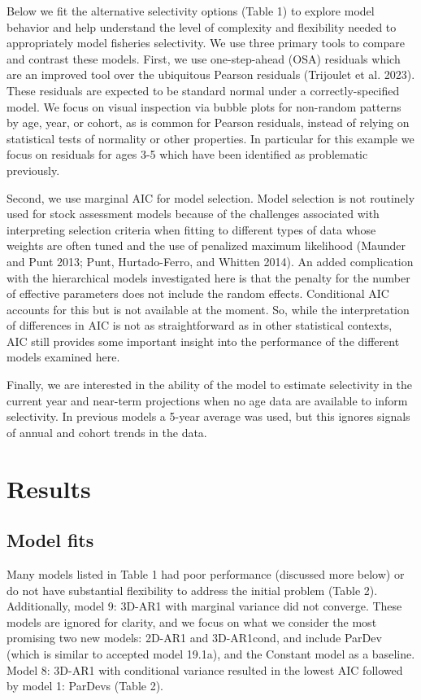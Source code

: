 \documentclass[
]{article}
\begin{document}
Below we fit the alternative selectivity options (Table 1) to explore
model behavior and help understand the level of complexity and
flexibility needed to appropriately model fisheries selectivity. We use
three primary tools to compare and contrast these models. First, we use
one-step-ahead (OSA) residuals which are an improved tool over the
ubiquitous Pearson residuals (Trijoulet et al. 2023). These residuals
are expected to be standard normal under a correctly-specified model. We
focus on visual inspection via bubble plots for non-random patterns by
age, year, or cohort, as is common for Pearson residuals, instead of
relying on statistical tests of normality or other properties. In
particular for this example we focus on residuals for ages 3-5 which
have been identified as problematic previously.

Second, we use marginal AIC for model selection. Model selection is not
routinely used for stock assessment models because of the challenges
associated with interpreting selection criteria when fitting to
different types of data whose weights are often tuned and the use of
penalized maximum likelihood (Maunder and Punt 2013; Punt,
Hurtado-Ferro, and Whitten 2014). An added complication with the
hierarchical models investigated here is that the penalty for the number
of effective parameters does not include the random effects. Conditional
AIC accounts for this but is not available at the moment. So, while the
interpretation of differences in AIC is not as straightforward as in
other statistical contexts, AIC still provides some important insight
into the performance of the different models examined here.

Finally, we are interested in the ability of the model to estimate
selectivity in the current year and near-term projections when no age
data are available to inform selectivity. In previous models a 5-year
average was used, but this ignores signals of annual and cohort trends
in the data.

\hypertarget{results}{%
\section{Results}\label{results}}

\hypertarget{model-fits}{%
\subsection{Model fits}\label{model-fits}}

Many models listed in Table 1 had poor performance (discussed more
below) or do not have substantial flexibility to address the initial
problem (Table 2). Additionally, model 9: 3D-AR1 with marginal variance
did not converge. These models are ignored for clarity, and we focus on
what we consider the most promising two new models: 2D-AR1 and
3D-AR1cond, and include ParDev (which is similar to accepted model
19.1a), and the Constant model as a baseline. Model 8: 3D-AR1 with
conditional variance resulted in the lowest AIC followed by model 1:
ParDevs (Table 2).
\end{document}
